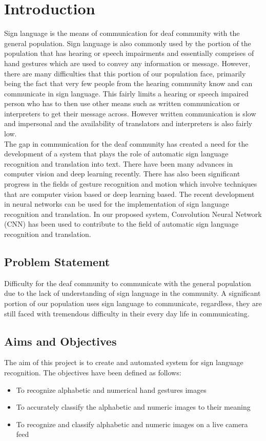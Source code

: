 \chapter{Introduction}
Sign language is the means of communication for deaf community with the general population. Sign language is also commonly used by the portion of the population that has hearing or speech impairments and essentially comprises of hand gestures which are used to convey any information or message. However, there are many difficulties that this portion of our population face, primarily being the fact that very few people from the hearing community know and can communicate in sign language. This fairly limits a hearing or speech impaired person who has to then use other means such as written communication or interpreters to get their message across. However written communication is slow and impersonal and the availability of translators and interpreters is also fairly low.  \\
The gap in communication for the deaf community has created a need for the development of a system that plays the role of automatic sign language recognition and translation into text. There have been many advances in computer vision and deep learning recently. There has also been significant progress in the fields of gesture recognition and motion which involve techniques that are computer vision based or deep learning based. The recent development in neural networks can be used for the implementation of sign language recognition and translation. In our proposed system, Convolution Neural Network (CNN) has been used to contribute to the field of automatic sign language recognition and translation.


\section{Problem Statement}
Difficulty for the deaf community to communicate with the general population due to the lack of understanding of sign language in the community. A significant portion of our population uses sign language to communicate, regardless, they are still faced with tremendous difficulty in their every day life in communicating.


\section{Aims and Objectives}
The aim of this project is to create and automated system for sign language recognition. The objectives have been defined as follows:  \\

\begin{itemize}
\item To recognize alphabetic and numerical hand gestures images
\item To accurately classify the alphabetic and numeric images to their meaning
\item To recognize and classify alphabetic and numeric images on a live camera feed
\end{itemize}

